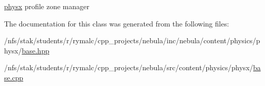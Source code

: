 \hyperlink{namespacenebula_1_1content_1_1physics_1_1physx}{physx} profile zone manager 

The documentation for this class was generated from the following files:\begin{DoxyCompactItemize}
\item 
/nfs/stak/students/r/rymalc/cpp\_\-projects/nebula/inc/nebula/content/physics/physx/\hyperlink{inc_2nebula_2content_2physics_2physx_2base_8hpp}{base.hpp}\item 
/nfs/stak/students/r/rymalc/cpp\_\-projects/nebula/src/content/physics/physx/\hyperlink{src_2content_2physics_2physx_2base_8cpp}{base.cpp}\end{DoxyCompactItemize}
